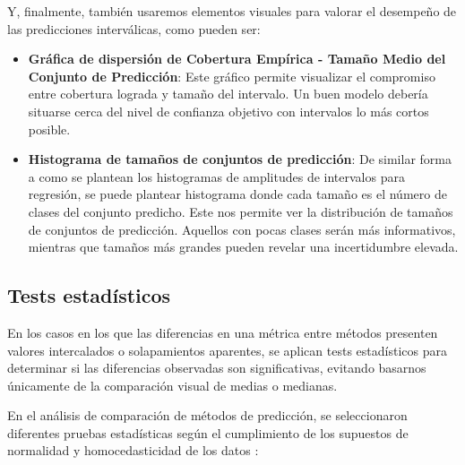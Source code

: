 Y, finalmente, también usaremos elementos visuales para valorar el desempeño de las predicciones interválicas, como pueden ser:

\begin{itemize}

    \item \textbf{Gráfica de dispersión de Cobertura Empírica - Tamaño Medio del Conjunto de Predicción}: Este gráfico permite visualizar el compromiso entre cobertura lograda y tamaño del intervalo. Un buen modelo debería situarse cerca del nivel de confianza objetivo con intervalos lo más cortos posible. 

    \item \textbf{Histograma de tamaños de conjuntos de predicción}: De similar forma a como se plantean los histogramas de amplitudes de intervalos para regresión, se puede plantear histograma donde cada tamaño es el número de clases del conjunto predicho. Este nos permite ver la distribución de tamaños de conjuntos de predicción. Aquellos con pocas clases serán más informativos, mientras que tamaños más grandes pueden revelar una incertidumbre elevada.
    
\end{itemize}


\subsection{Tests estadísticos}

En los casos en los que las diferencias en una métrica entre métodos presenten valores intercalados o solapamientos aparentes, se aplican tests estadísticos para determinar si las diferencias observadas son significativas, evitando basarnos únicamente de la comparación visual de medias o medianas.

En el análisis de comparación de métodos de predicción, se seleccionaron diferentes pruebas estadísticas según el cumplimiento de los supuestos de normalidad y homocedasticidad de los datos \cite{agbangba2024use}:


